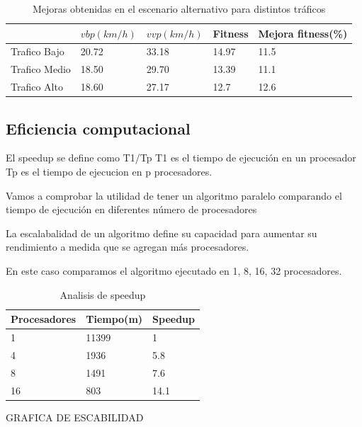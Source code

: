 \begin{table}[h]
	\renewcommand{\arraystretch}{1.2}
	\caption{Mejoras obtenidas en el escenario alternativo para distintos tráficos }
	\label{table:mejoras_trafico_alternativo}
	\centering
	\begin{tabular}{p{3.5cm}p{2.5cm}p{2.5cm}p{2cm}p{2cm} }
		\hline
		&
		$vbp(km/h)$& 
		$vvp(km/h)$ & 
		Fitness &
		Mejora fitness(\%)
		\\ 
		\hline

		Trafico Bajo & 20.72  & 33.18 & 14.97 & 11.5\\
		Trafico Medio & 18.50  & 29.70& 13.39 & 11.1 \\
		Trafico Alto  & 18.60  & 27.17& 12.7 & 12.6\\		
		\hline
	\end{tabular}
\end{table}


\subsection{Eficiencia computacional}

El speedup se define como T1/Tp
T1 es el tiempo de ejecución en un procesador
Tp es el tiempo de ejecucion en p procesadores.


Vamos a comprobar la utilidad de tener un algoritmo paralelo comparando el tiempo de ejecución en diferentes número de procesadores

La escalabalidad de un algoritmo define su capacidad para aumentar su rendimiento a medida que se agregan más procesadores.

En este caso comparamos el algoritmo ejecutado en 1, 8, 16, 32 procesadores.



\begin{table}[h]
	\renewcommand{\arraystretch}{1.2}
	\caption{Analisis de speedup }
	\label{table:analisis_speedup}
	\centering
	\begin{tabular}{p{2.5cm}p{2.5cm}p{2.5cm} }
		\hline

		Procesadores& 
		Tiempo(m) & 
		Speedup 
		\\ 
		\hline
		1  & 11399 & 1\\
		4  & 1936 & 5.8 \\
		8  & 1491 & 7.6 \\
		16  & 803 & 14.1 \\
		\hline
	\end{tabular}
\end{table}
GRAFICA DE ESCABILIDAD

